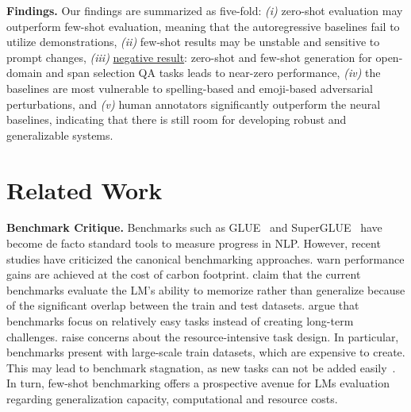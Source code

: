 \documentclass[11pt]{article}
\begin{document}
\vspace{0.2em}
\noindent \textbf{Findings.} Our findings are summarized as five-fold: \emph{(i)} zero-shot evaluation may outperform few-shot evaluation, meaning that the autoregressive baselines fail to utilize demonstrations, \emph{(ii)} few-shot results may be unstable and sensitive to prompt changes, \emph{(iii)} \underline{negative result}: zero-shot and few-shot generation for open-domain and span selection QA tasks leads to near-zero performance, \emph{(iv)} the baselines are most vulnerable to spelling-based and emoji-based adversarial perturbations, and \emph{(v)} human annotators significantly outperform the neural baselines, indicating that there is still room for developing robust and generalizable systems.
 

\section{Related Work}
\noindent \textbf{Benchmark Critique.} Benchmarks such as GLUE~\cite{wang-etal-2018-glue} and SuperGLUE~\cite{wang2019superglue} have become de facto standard tools to measure progress in NLP. However, recent studies have criticized the canonical benchmarking approaches. \citet{bender2021dangers} warn performance gains are achieved at the cost of carbon footprint. \citet{elangovan-etal-2021-memorization} claim that the current benchmarks evaluate the LM's ability to memorize rather than generalize because of the significant overlap between the train and test datasets. \citet{church2022emerging} argue that benchmarks focus on relatively easy tasks instead of creating long-term challenges.  \citet{raji2021ai} raise concerns about the resource-intensive task design. In particular, benchmarks present with large-scale train datasets, which are expensive to create. This may lead to benchmark stagnation, as new tasks can not be added easily~\cite{barbosa2022mapping}. In turn, few-shot benchmarking offers a prospective avenue for LMs evaluation regarding generalization capacity, computational and resource costs.
\end{document}
